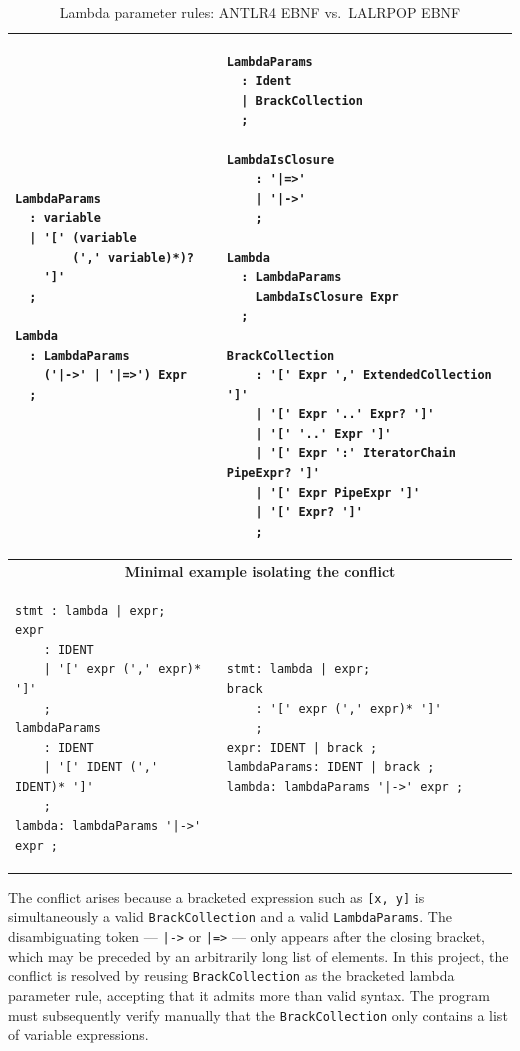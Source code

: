 \begin{table}[h]
    \centering
    \caption{Lambda parameter rules: ANTLR4 EBNF vs.\ LALRPOP EBNF}
    \renewcommand{\arraystretch}{1}
    \begin{tabular}{ |p{6cm}|p{8cm}| }
        \hline
\begin{lstlisting}
LambdaParams
  : variable
  | '[' (variable
        (',' variable)*)?
    ']'
  ;

Lambda
  : LambdaParams
    ('|->' | '|=>') Expr
  ;
\end{lstlisting}
&
\begin{lstlisting}
LambdaParams
  : Ident
  | BrackCollection
  ;

LambdaIsClosure
    : '|=>'
    | '|->'
    ;

Lambda
  : LambdaParams
    LambdaIsClosure Expr
  ;

BrackCollection
    : '[' Expr ',' ExtendedCollection ']'
    | '[' Expr '..' Expr? ']'
    | '[' '..' Expr ']'
    | '[' Expr ':' IteratorChain PipeExpr? ']'
    | '[' Expr PipeExpr ']'
    | '[' Expr? ']'
    ;
\end{lstlisting}
\\
        \hline
        \multicolumn{2}{|c|}{\textbf{Minimal example isolating the conflict}} \\
\begin{lstlisting}
stmt : lambda | expr;
expr
    : IDENT
    | '[' expr (',' expr)* ']'
    ;
lambdaParams
    : IDENT
    | '[' IDENT (',' IDENT)* ']'
    ;
lambda: lambdaParams '|->' expr ;
\end{lstlisting}
&
\begin{lstlisting}
stmt: lambda | expr;
brack
    : '[' expr (',' expr)* ']'
    ;
expr: IDENT | brack ;
lambdaParams: IDENT | brack ;
lambda: lambdaParams '|->' expr ;
\end{lstlisting}
\\
        \hline
    \end{tabular}
\end{table}
\FloatBarrier

The conflict arises because a bracketed expression such as \texttt{[x, y]} is simultaneously a valid \texttt{BrackCollection} and a valid \texttt{LambdaParams}. The disambiguating token --- \texttt{|->} or \texttt{|=>} --- only appears after the closing bracket, which may be preceded by an arbitrarily long list of elements. In this project, the conflict is resolved by reusing \texttt{BrackCollection} as the bracketed lambda parameter rule, accepting that it admits more than valid syntax. The program must subsequently verify manually that the \texttt{BrackCollection} only contains a list of variable expressions.

